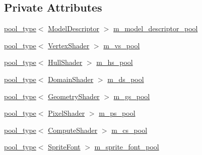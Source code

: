 \subsection*{Private Attributes}
\begin{DoxyCompactItemize}
\item 
\hyperlink{classmage_1_1_resource_manager_a4416f0a710790d8aa2d0bc006764695a}{pool\+\_\+type}$<$ \hyperlink{classmage_1_1_model_descriptor}{Model\+Descriptor} $>$ \hyperlink{classmage_1_1_resource_manager_a6c79aeb11bed60bdf3e8420fddc72948}{m\+\_\+model\+\_\+descriptor\+\_\+pool}
\item 
\hyperlink{classmage_1_1_resource_manager_a4416f0a710790d8aa2d0bc006764695a}{pool\+\_\+type}$<$ \hyperlink{classmage_1_1_vertex_shader}{Vertex\+Shader} $>$ \hyperlink{classmage_1_1_resource_manager_ab8751a95e77af4000106e02bf8b4f8cb}{m\+\_\+vs\+\_\+pool}
\item 
\hyperlink{classmage_1_1_resource_manager_a4416f0a710790d8aa2d0bc006764695a}{pool\+\_\+type}$<$ \hyperlink{namespacemage_a964e5e384b0e55ac900c819da48b6000}{Hull\+Shader} $>$ \hyperlink{classmage_1_1_resource_manager_aada8daa06b929bb23d2b0c2205a1573e}{m\+\_\+hs\+\_\+pool}
\item 
\hyperlink{classmage_1_1_resource_manager_a4416f0a710790d8aa2d0bc006764695a}{pool\+\_\+type}$<$ \hyperlink{namespacemage_aef8cda73e2387cb89baa6c54a7fea542}{Domain\+Shader} $>$ \hyperlink{classmage_1_1_resource_manager_a75da17496bfee1396d5f99c4b2f6534f}{m\+\_\+ds\+\_\+pool}
\item 
\hyperlink{classmage_1_1_resource_manager_a4416f0a710790d8aa2d0bc006764695a}{pool\+\_\+type}$<$ \hyperlink{namespacemage_a0cf0bb4b74903e78658c96412d5687a6}{Geometry\+Shader} $>$ \hyperlink{classmage_1_1_resource_manager_a8a1187e9291a442df598cdccd947432f}{m\+\_\+gs\+\_\+pool}
\item 
\hyperlink{classmage_1_1_resource_manager_a4416f0a710790d8aa2d0bc006764695a}{pool\+\_\+type}$<$ \hyperlink{namespacemage_a27ecaf266420ee7a494d64edc0757129}{Pixel\+Shader} $>$ \hyperlink{classmage_1_1_resource_manager_ad42cd06ff92906685055f9374366136f}{m\+\_\+ps\+\_\+pool}
\item 
\hyperlink{classmage_1_1_resource_manager_a4416f0a710790d8aa2d0bc006764695a}{pool\+\_\+type}$<$ \hyperlink{namespacemage_ae040329401484b076f0cd1a7c43d19c9}{Compute\+Shader} $>$ \hyperlink{classmage_1_1_resource_manager_a1af8cfdf9fbde3d3ed135fea32330ea1}{m\+\_\+cs\+\_\+pool}
\item 
\hyperlink{classmage_1_1_resource_manager_a4416f0a710790d8aa2d0bc006764695a}{pool\+\_\+type}$<$ \hyperlink{classmage_1_1_sprite_font}{Sprite\+Font} $>$ \hyperlink{classmage_1_1_resource_manager_a17287590aebff7d1f345dd83af5980fd}{m\+\_\+sprite\+\_\+font\+\_\+pool}

\end{DoxyCompactItemize}
